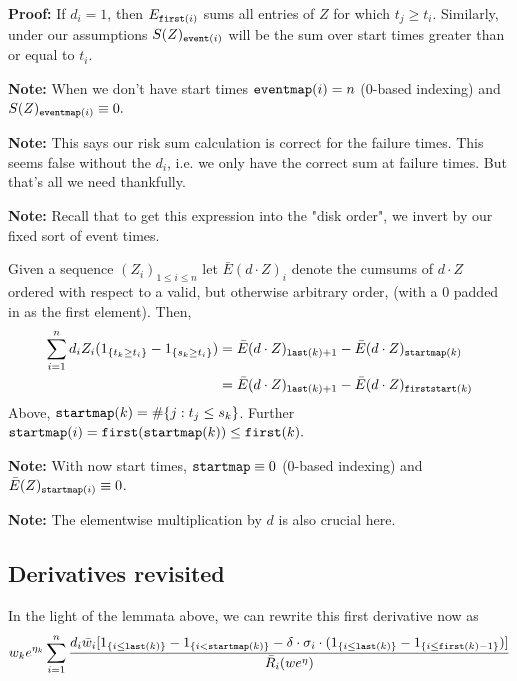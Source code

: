 \documentclass{article}
\begin{document}
{\bf Proof:}
If $d_i=1$, then $E_{{\tt first}(i)}$ sums all entries of
$Z$ for which $t_j \geq t_i$. Similarly, 
under our assumptions $S(Z)_{{\tt event}(i)}$ will be the
sum over start times greater than or equal to $t_i$.

{\bf Note:} When we don't have start times ${\tt eventmap}(i)=n$ (0-based indexing) and $S(Z)_{{\tt eventmap}(i)} \equiv 0.$

{\bf Note:} This says our risk sum calculation is correct for the failure times. This seems false without the $d_i$, i.e. we only have the correct sum at failure times. But that's all we need thankfully.

{\bf Note:} Recall that to get this expression into
the "disk order", we invert by our fixed sort of
event times.

\begin{lemma}
\label{lem:adjoint}
Given a sequence $(Z_i)_{1 \leq i \leq n}$ let 
$\bar{E}(d \cdot Z)_i$ denote the cumsums of $d \cdot Z$ ordered with respect to a valid, but otherwise arbitrary order, (with a 0 padded in as the first element). Then,
$$
\begin{aligned}
    \sum_{i=1}^n d_i Z_i (1_{\{t_k \geq t_i\}} - 1_{\{s_k \geq t_i\}}) &=
\bar{E}(d \cdot Z)_{{\tt last}(k)+1} - \bar{E}(d \cdot Z)_{{\tt startmap}(k)} \\
&= 
\bar{E}(d \cdot Z)_{{\tt last}(k)+1} - \bar{E}(d \cdot Z)_{{\tt firststart}(k)}
\end{aligned}
$$
Above, ${\tt startmap}(k) = \# \{j: t_j \leq s_k\}$. Further
${\tt startmap}(i) = {\tt first}({\tt startmap}(k)) \leq {\tt first}(k).$

\end{lemma}

{\bf Note:} With now start times, ${\tt startmap} \equiv 0$ (0-based indexing)
and $\bar{E}(Z)_{{\tt startmap}(i)} \equiv 0$.

{\bf Note:} The elementwise multiplication by $d$ is also crucial here. 

\subsection{Derivatives revisited}

In the light of the lemmata above, we can rewrite this first derivative now as 
$$
w_k e^{\eta_k}\sum_{i=1}^n \frac{d_i \bar{w}_i [1_{\{i \leq {\tt last}(k)\}} - 1_{\{i < {\tt startmap}(k)\}} - \delta \cdot \sigma_i \cdot( 1_{\{i \leq {\tt last}(k)\}} - 1_{\{i \leq {\tt first}(k)-1\}}) ]}{\bar{R}_i(we^{\eta})}
$$
\end{document}
